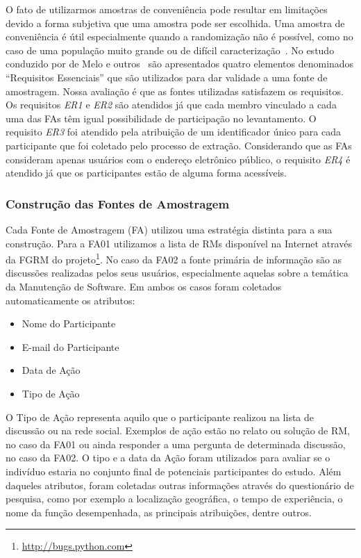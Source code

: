 O fato de utilizarmos amostras de conveniência pode resultar em limitações
devido a forma subjetiva que uma amostra pode ser escolhida. Uma amostra de
conveniência é útil especialmente quando a randomização não é possível, como no
caso de uma população muito grande ou de difícil
caracterização~\cite{boxill1997introduction}. No estudo conduzido por de Melo e
outros~\cite{de2014towards} são apresentados quatro elementos denominados
``Requisitos Essenciais'' que são utilizados para dar validade a uma fonte de
amostragem. Nossa avaliação é que as fontes utilizadas satisfazem os
requisitos. Os requisitos \textit{ER1} e \textit{ER2} são atendidos já que cada
membro vinculado a cada uma das FAs têm igual possibilidade de participação no
levantamento. O requisito \textit{ER3} foi atendido pela atribuição de um
identificador único para cada participante que foi coletado pelo processo de
extração. Considerando que as FAs consideram apenas usuários com o endereço
eletrônico público, o requisito \textit{ER4} é atendido já que os participantes
estão de alguma forma acessíveis.

\subsubsection{Construção das Fontes de Amostragem}\label{subsubsec:construcao_fonte_amostragem}

Cada Fonte de Amostragem (FA) utilizou uma estratégia distinta para a sua
construção. Para a FA01 utilizamos a lista de RMs disponível na Internet através
da FGRM do projeto\footnote{\url{http://bugs.python.com}}. No caso da FA02 a
fonte primária de informação são as discussões realizadas pelos seus usuários,
especialmente aquelas sobre a temática da Manutenção de Software. Em ambos os
casos foram coletados automaticamente os atributos:

\begin{itemize}
	\item Nome do Participante
	\item E-mail do Participante
	\item Data de Ação
	\item Tipo de Ação
\end{itemize}

O Tipo de Ação representa aquilo que o participante realizou na lista de
discussão ou na rede social. Exemplos de ação estão no relato ou solução de RM,
no caso da FA01 ou ainda responder a uma pergunta de determinada discussão, no
caso da FA02. O tipo e a data da Ação foram utilizados para avaliar se o
indivíduo estaria no conjunto final de potenciais participantes do estudo. Além
daqueles atributos, foram coletadas outras informações através do questionário
de pesquisa, como por exemplo a localização geográfica, o tempo de experiência,
o nome da função desempenhada, as principais atribuições, dentre outros.


